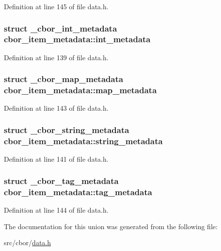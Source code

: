 Definition at line 145 of file data.\-h.

\hypertarget{unioncbor__item__metadata_a9dbedd1621e78d4817c359849ffd75a9}{
\subsubsection[{int\-\_\-metadata}]{\setlength{\rightskip}{0pt plus 5cm}struct {\bf \-\_\-cbor\-\_\-int\-\_\-metadata} cbor\-\_\-item\-\_\-metadata\-::int\-\_\-metadata}}\label{unioncbor__item__metadata_a9dbedd1621e78d4817c359849ffd75a9}


Definition at line 139 of file data.\-h.

\hypertarget{unioncbor__item__metadata_ac497580bfcb0c0e47438a45407ac7b4e}{
\subsubsection[{map\-\_\-metadata}]{\setlength{\rightskip}{0pt plus 5cm}struct {\bf \-\_\-cbor\-\_\-map\-\_\-metadata} cbor\-\_\-item\-\_\-metadata\-::map\-\_\-metadata}}\label{unioncbor__item__metadata_ac497580bfcb0c0e47438a45407ac7b4e}


Definition at line 143 of file data.\-h.

\hypertarget{unioncbor__item__metadata_a753eccc4105c3861dd40f50681ff18df}{
\subsubsection[{string\-\_\-metadata}]{\setlength{\rightskip}{0pt plus 5cm}struct {\bf \-\_\-cbor\-\_\-string\-\_\-metadata} cbor\-\_\-item\-\_\-metadata\-::string\-\_\-metadata}}\label{unioncbor__item__metadata_a753eccc4105c3861dd40f50681ff18df}


Definition at line 141 of file data.\-h.

\hypertarget{unioncbor__item__metadata_a7cf72d7dbb3104bd14d0e4934646212f}{
\subsubsection[{tag\-\_\-metadata}]{\setlength{\rightskip}{0pt plus 5cm}struct {\bf \-\_\-cbor\-\_\-tag\-\_\-metadata} cbor\-\_\-item\-\_\-metadata\-::tag\-\_\-metadata}}\label{unioncbor__item__metadata_a7cf72d7dbb3104bd14d0e4934646212f}


Definition at line 144 of file data.\-h.



The documentation for this union was generated from the following file\-:\begin{DoxyCompactItemize}
\item 
src/cbor/\hyperlink{data_8h}{data.\-h}\end{DoxyCompactItemize}
